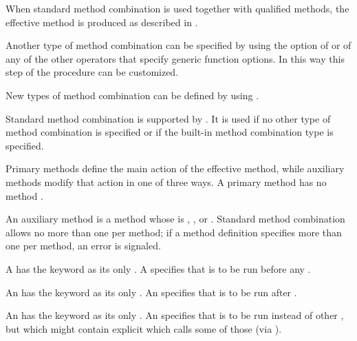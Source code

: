 When standard method combination is used together with qualified methods, 
the effective method is produced as described in \secref\StdMethComb.
                                                                  
Another type of method combination can be specified by using the
 option of  or
of any of the other operators that specify generic function options.  In
this way this step of the procedure can be customized.

New types of method combination can be defined by using 
. 

\endsubsubsubsection%

\endsubsubsection%

                                                       
Standard method combination is supported by .
It is used if no other type of method
combination is specified or if the built-in method combination type
 is specified. 

Primary methods define the main action of the effective method,  
while auxiliary methods modify that action in one of three ways.
A primary method has no method .
                                                           
An auxiliary method is a method whose 
 is , , or .
Standard method combination
allows no more than one  per method; if a method definition
specifies more than one  per method, an error is signaled.

\beginlist

\itemitem{\bull}
A  has the keyword  as its only .
A  specifies  that is to be run before any 
.

\itemitem{\bull}
An  has the keyword  as its only .
An  specifies  that is to be run after
.

\itemitem{\bull}
An  has the keyword  as its only .
An  specifies  that is to be run instead of other
,
but which might contain explicit 
which calls some of those  
(via ).

